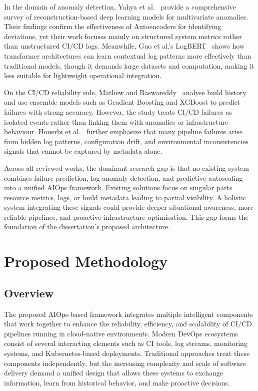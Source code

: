 \documentclass[a4paper,14pt,onecolumn]{report}
\begin{document}
In the domain of anomaly detection, Yahya et al.~\cite{yahya2025} provide a comprehensive survey of reconstruction-based deep learning models for multivariate anomalies. Their findings confirm the effectiveness of Autoencoders for identifying deviations, yet their work focuses mainly on structured system metrics rather than unstructured CI/CD logs. Meanwhile, Guo et al.'s LogBERT~\cite{guo2021} shows how transformer architectures can learn contextual log patterns more effectively than traditional models, though it demands large datasets and computation, making it less suitable for lightweight operational integration.

On the CI/CD reliability side, Mathew and Baswareddy~\cite{mathew2025} analyse build history and use ensemble models such as Gradient Boosting and XGBoost to predict failures with strong accuracy. However, the study treats CI/CD failures as isolated events rather than linking them with anomalies or infrastructure behaviour. Houerbi et al.~\cite{houerbi2024} further emphasize that many pipeline failures arise from hidden log patterns, configuration drift, and environmental inconsistencies signals that cannot be captured by metadata alone.

Across all reviewed works, the dominant research gap is that no existing system combines failure prediction, log anomaly detection, and predictive autoscaling into a unified AIOps framework. Existing solutions focus on singular parts resource metrics, logs, or build metadata leading to partial visibility. A holistic system integrating these signals could provide deeper situational awareness, more reliable pipelines, and proactive infrastructure optimisation. This gap forms the foundation of the dissertation's proposed architecture.

\chapter{Proposed Methodology}

\section{Overview}

The proposed AIOps-based framework integrates multiple intelligent components that work together to enhance the reliability, efficiency, and scalability of CI/CD pipelines running in cloud-native environments. Modern DevOps ecosystems consist of several interacting elements such as CI tools, log streams, monitoring systems, and Kubernetes-based deployments. Traditional approaches treat these components independently, but the increasing complexity and scale of software delivery demand a unified design that allows these systems to exchange information, learn from historical behavior, and make proactive decisions.
\end{document}
